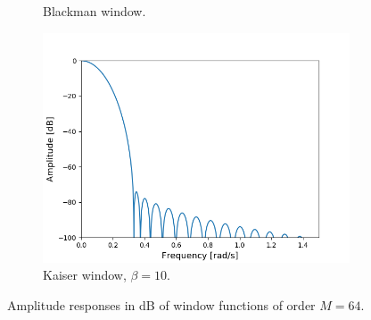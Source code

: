 \begin{figure}[H]
\begin{subfigure}{0.49\textwidth}
\caption{Blackman window.}
\includegraphics[width=\textwidth]{figures/dbplots/stft_bilag/64/kaiser10.png}
\caption{Kaiser window, $\beta=10$.}
\end{subfigure}

\caption{Amplitude responses in dB of window functions of order $M=64$.}
\label{fig:db_plots_64}
\end{figure}

